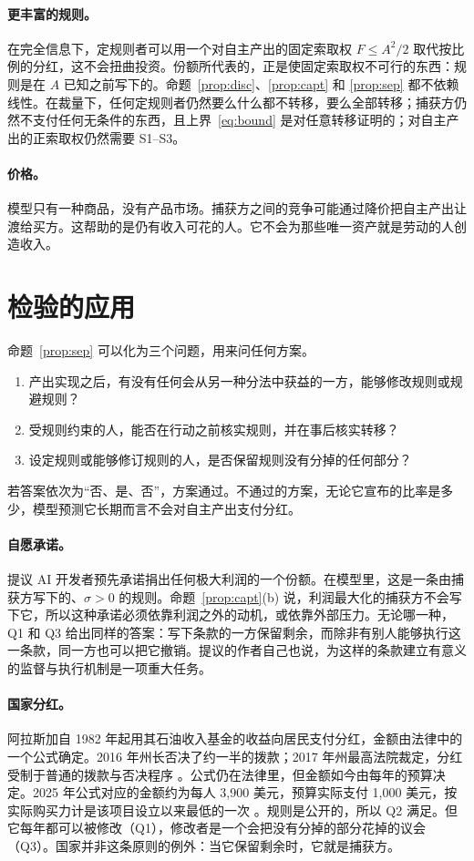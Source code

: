 \paragraph{更丰富的规则。} 在完全信息下，定规则者可以用一个对自主产出的固定索取权
$F\le A^2/2$ 取代按比例的分红，这不会扭曲投资。份额所代表的，正是使固定索取权不可行的东西：规则是在 $A$ 已知之前写下的。命题~\ref{prop:disc}、\ref{prop:capt} 和
\ref{prop:sep} 都不依赖线性。在裁量下，任何定规则者仍然要么什么都不转移，要么全部转移；捕获方仍然不支付任何无条件的东西，且上界~\eqref{eq:bound} 是对任意转移证明的；对自主产出的正索取权仍然需要 S1--S3。

\paragraph{价格。} 模型只有一种商品，没有产品市场。捕获方之间的竞争可能通过降价把自主产出让渡给买方。这帮助的是仍有收入可花的人。它不会为那些唯一资产就是劳动的人创造收入。

\section{检验的应用}\label{sec:test}

命题~\ref{prop:sep} 可以化为三个问题，用来问任何方案。
\begin{enumerate}[label=Q\arabic*.,leftmargin=3em]
\item 产出实现之后，有没有任何会从另一种分法中获益的一方，能够修改规则或规避规则？
\item 受规则约束的人，能否在行动之前核实规则，并在事后核实转移？
\item 设定规则或能够修订规则的人，是否保留规则没有分掉的任何部分？
\end{enumerate}
若答案依次为“否、是、否”，方案通过。不通过的方案，无论它宣布的比率是多少，模型预测它长期而言不会对自主产出支付分红。

\paragraph{自愿承诺。} \citet{OKeefe2020} 提议 AI 开发者预先承诺捐出任何极大利润的一个份额。在模型里，这是一条由捕获方写下的、$\sigma>0$ 的规则。命题~\ref{prop:capt}(b) 说，利润最大化的捕获方不会写下它，所以这种承诺必须依靠利润之外的动机，或依靠外部压力。无论哪一种，Q1 和 Q3 给出同样的答案：写下条款的一方保留剩余，而除非有别人能够执行这一条款，同一方也可以把它撤销。提议的作者自己也说，为这样的条款建立有意义的监督与执行机制是一项重大任务。

\paragraph{国家分红。} 阿拉斯加自 1982 年起用其石油收入基金的收益向居民支付分红，金额由法律中的一个公式确定。2016 年州长否决了约一半的拨款；2017 年州最高法院裁定，分红受制于普通的拨款与否决程序 \citep{Wielechowski2017}。公式仍在法律里，但金额如今由每年的预算决定。2025 年公式对应的金额约为每人 3{,}900 美元，预算实际支付 1{,}000 美元，按实际购买力计是该项目设立以来最低的一次 \citep{AlaskaPublic2025,AlaskaDOR2025}。规则是公开的，所以
Q2 满足。但它每年都可以被修改（Q1），修改者是一个会把没有分掉的部分花掉的议会（Q3）。国家并非这条原则的例外：当它保留剩余时，它就是捕获方。

